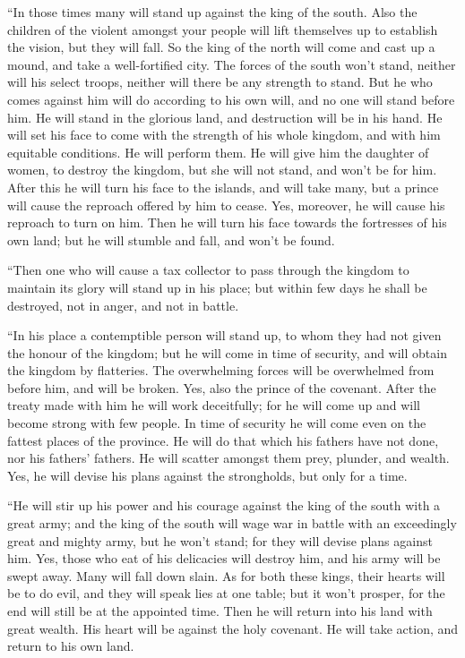  ``In those times many will stand up against the king of
the south. Also the children of the violent amongst your people will
lift themselves up to establish the vision, but they will fall.
 So the king of the north will come and cast up a mound,
and take a well-fortified city. The forces of the south won't stand,
neither will his select troops, neither will there be any strength to
stand.  But he who comes against him will do according to
his own will, and no one will stand before him. He will stand in the
glorious land, and destruction will be in his hand.  He
will set his face to come with the strength of his whole kingdom, and
with him equitable conditions. He will perform them. He will give him
the daughter of women, to destroy the kingdom, but she will not stand,
and won't be for him.  After this he will turn his face
to the islands, and will take many, but a prince will cause the reproach
offered by him to cease. Yes, moreover, he will cause his reproach to
turn on him.  Then he will turn his face towards the
fortresses of his own land; but he will stumble and fall, and won't be
found.

 ``Then one who will cause a tax collector to pass
through the kingdom to maintain its glory will stand up in his place;
but within few days he shall be destroyed, not in anger, and not in
battle.

 ``In his place a contemptible person will stand up, to
whom they had not given the honour of the kingdom; but he will come in
time of security, and will obtain the kingdom by flatteries.
 The overwhelming forces will be overwhelmed from before
him, and will be broken. Yes, also the prince of the covenant.
 After the treaty made with him he will work deceitfully;
for he will come up and will become strong with few people.
 In time of security he will come even on the fattest
places of the province. He will do that which his fathers have not done,
nor his fathers' fathers. He will scatter amongst them prey, plunder,
and wealth. Yes, he will devise his plans against the strongholds, but
only for a time.

 ``He will stir up his power and his courage against the
king of the south with a great army; and the king of the south will wage
war in battle with an exceedingly great and mighty army, but he won't
stand; for they will devise plans against him.  Yes,
those who eat of his delicacies will destroy him, and his army will be
swept away. Many will fall down slain.  As for both these
kings, their hearts will be to do evil, and they will speak lies at one
table; but it won't prosper, for the end will still be at the appointed
time.  Then he will return into his land with great
wealth. His heart will be against the holy covenant. He will take
action, and return to his own land.

